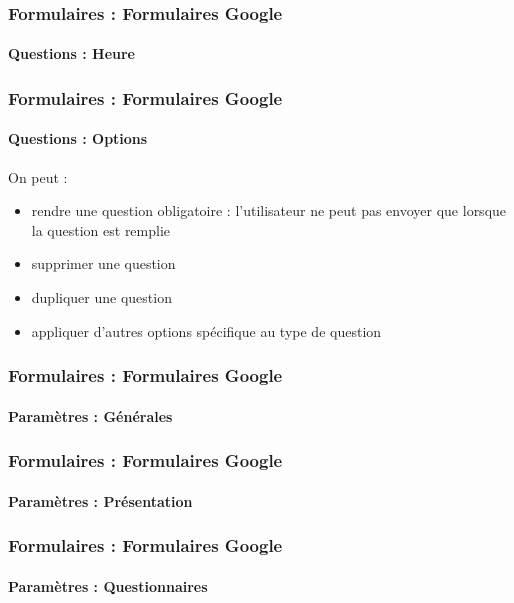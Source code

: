 \documentclass[xcolor=table]{beamer}
\begin{document}
\begin{frame}
\frametitle{Formulaires : Formulaires Google}
\framesubtitle{Questions : Heure}

\begin{center}
	
\end{center}

\end{frame}

\begin{frame}
\frametitle{Formulaires : Formulaires Google}
\framesubtitle{Questions : Options}

\begin{center}
\end{center}

On peut : 
\begin{itemize}
	\item rendre une question obligatoire : l'utilisateur ne peut pas envoyer que lorsque la question est remplie 
	\item supprimer une question 
	\item dupliquer une question
	\item appliquer d'autres options spécifique au type de question
\end{itemize}

\end{frame}

\begin{frame}
\frametitle{Formulaires : Formulaires Google}
\framesubtitle{Paramètres : Générales}

\begin{center}
\end{center}

\end{frame}

\begin{frame}
\frametitle{Formulaires : Formulaires Google}
\framesubtitle{Paramètres : Présentation}

\begin{center}
\end{center}

\end{frame}

\begin{frame}
\frametitle{Formulaires : Formulaires Google}
\framesubtitle{Paramètres : Questionnaires}

\begin{center}
\end{center}

\end{frame}
\end{document}
